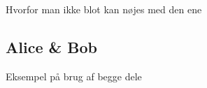 Hvorfor man ikke blot kan nøjes med den ene
    \subsection{Alice \& Bob}
    Eksempel på brug af begge dele
